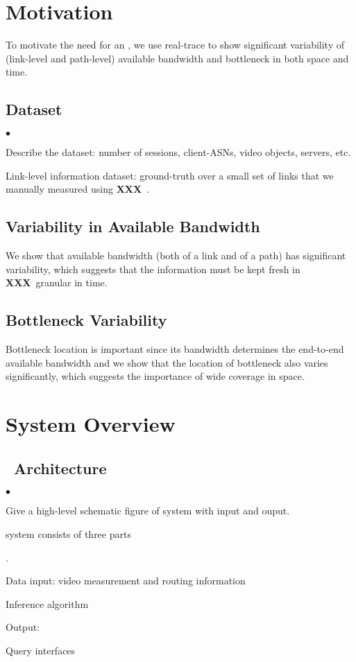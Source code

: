 \documentclass[10pt,twocolumn]{article}
\newcommand{\fillme}{{\bf XXX}~}
\newcounter{packednmbr}
\newenvironment{packedenumerate}{\begin{list}{\thepackednmbr.}{\usecounter{packednmbr}\setlength{\itemsep}{0.5pt}\addtolength{\labelwidth}{-4pt}\setlength{\leftmargin}{\labelwidth}\setlength{\listparindent}{\parindent}\setlength{\parsep}{1pt}\setlength{\topsep}{0pt}}}{\end{list}}
\newenvironment{packeditemize}{\begin{list}{$\bullet$}{\setlength{\itemsep}{0.5pt}\addtolength{\labelwidth}{-4pt}\setlength{\leftmargin}{\labelwidth}\setlength{\listparindent}{\parindent}\setlength{\parsep}{1pt}\setlength{\topsep}{0pt}}}{\end{list}}
\begin{document}
\section{Motivation}
To motivate the need for an \itm, we use real-trace to show significant variability of (link-level and path-level) available bandwidth and bottleneck in both space and time. 

\subsection{Dataset}
\begin{packeditemize}
	\item Describe the dataset: number of sessions, client-ASNs, video objects, servers, etc.
	\item Link-level information dataset: ground-truth over a small set of links that we manually measured using \fillme.
\end{packeditemize}


\subsection{Variability in Available Bandwidth}
We show that available bandwidth (both of a link and of a path) has significant variability, which suggests that the information must be kept fresh in \fillme granular in time.


\subsection{Bottleneck Variability}
Bottleneck location is important since its bandwidth determines the end-to-end available bandwidth and we show that the location of bottleneck also varies significantly, which suggests the importance of wide coverage in space.


\section{System Overview}
\subsection{\itm ~Architecture}
\begin{packeditemize}
	\item Give a high-level schematic figure of \itm system with input and ouput.
	\item \itm system consists of three parts
	\begin{packedenumerate}
		\item Data input: video measurement and routing information
		\item Inference algorithm
		\item Output: \itm
		\item Query interfaces
	\end{packedenumerate}
\end{packeditemize}
\end{document}
